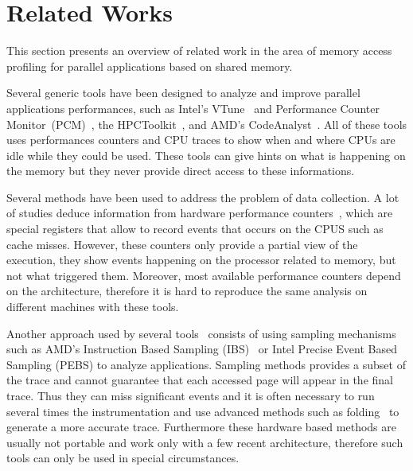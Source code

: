 
\section{Related Works}
\label{sec:related}

This section presents an overview of related work in the area of memory access
profiling for parallel applications based on shared memory.

Several generic tools have been designed to analyze and improve parallel
applications performances, such as Intel's VTune~\cite{Reinders05VTune} and
Performance Counter Monitor~(PCM)~\cite{Intel2012b}, the
HPCToolkit~\cite{Adhianto10HPCTOOLKIT}, and AMD's
CodeAnalyst~\cite{Drongowski2008}. All of these tools uses performances
counters and CPU traces to show when and where CPUs are idle while they could
be used. These tools can give hints on what is happening on the memory but
they never provide direct access to these informations.

Several methods have been used to address the problem of data collection. A
lot of studies deduce information from hardware performance
counters~\cite{Majo13(Mis)understanding,
Jiang14Understanding,Bosch00Rivet,Weyers14Visualization,Tao01Visualizing,DeRose01Hardware},
which are special registers that allow to record events that occurs on the
CPUS such as cache misses. However, these counters only provide a partial
view of the execution, they show events happening on the processor related to
memory, but not what triggered them. Moreover, most available performance counters
depend on the architecture, therefore it is hard to reproduce the same
analysis on different machines with these tools.

Another approach used by several
tools~\cite{Lachaize12MemProf,McCurdy10Memphis,Liu14Tool,Gimenez14Dissecting}
consists of using sampling mechanisms such as AMD's Instruction Based Sampling
(IBS)~\cite{Drongowski07Instructionbased} or Intel Precise Event Based
Sampling (PEBS) to analyze applications. Sampling methods provides a subset of
the trace and cannot guarantee that each accessed page will appear in the
final trace. Thus they can miss significant events and it is often necessary
to run several times the instrumentation and use advanced methods such as
folding~\cite{Servat15Towards}  to generate a more accurate trace. Furthermore these hardware
based methods are usually not portable and work only with a few recent
architecture, therefore such tools can only be used in special circumstances.

